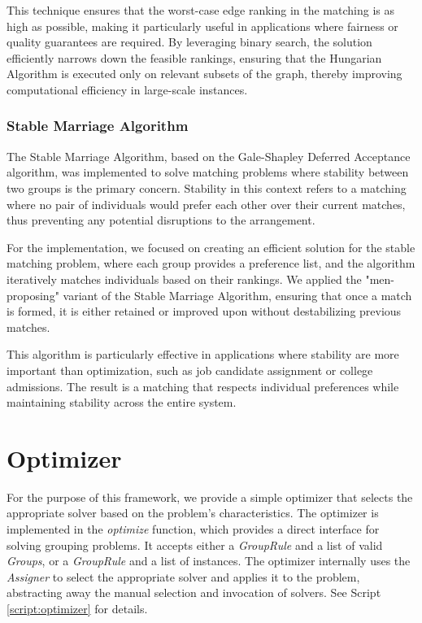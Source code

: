         This technique ensures that the worst-case edge ranking in the matching is as high as possible, making it particularly useful in applications where fairness or quality guarantees are required. By leveraging binary search, the solution efficiently narrows down the feasible rankings, ensuring that the Hungarian Algorithm is executed only on relevant subsets of the graph, thereby improving computational efficiency in large-scale instances.
        
    
    \subsubsection{Stable Marriage Algorithm}
    The Stable Marriage Algorithm, based on the Gale-Shapley Deferred Acceptance algorithm, was implemented to solve matching problems where stability between two groups is the primary concern. Stability in this context refers to a matching where no pair of individuals would prefer each other over their current matches, thus preventing any potential disruptions to the arrangement.
    
    For the implementation, we focused on creating an efficient solution for the stable matching problem, where each group provides a preference list, and the algorithm iteratively matches individuals based on their rankings. We applied the "men-proposing" variant of the Stable Marriage Algorithm, ensuring that once a match is formed, it is either retained or improved upon without destabilizing previous matches.
    
    This algorithm is particularly effective in applications where stability are more important than optimization, such as job candidate assignment or college admissions. The result is a matching that respects individual preferences while maintaining stability across the entire system.

    \section{Optimizer}
    For the purpose of this framework, we provide a simple optimizer that selects the appropriate solver based on the problem's characteristics.
    The optimizer is implemented in the \textit{optimize} function, which provides a direct interface for solving grouping problems.
    It accepts either a \textit{GroupRule} and a list of valid \textit{Groups}, or a \textit{GroupRule} and a list of instances.
    The optimizer internally uses the \textit{Assigner} to select the appropriate solver and applies it to the problem, abstracting away the manual selection and invocation of solvers.
    See Script \ref{script:optimizer} for details.

